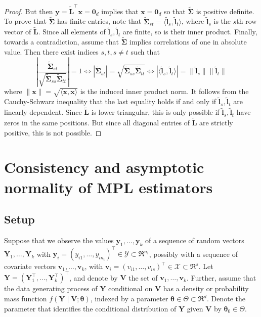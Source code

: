 \documentclass[11pt, a4paper]{article}
\newcommand*{\bb}{\boldsymbol}
\theoremstyle{example} \newtheorem{example}{Example}[section]
\theoremstyle{theorem} \newtheorem{theorem}{Theorem}[section]
\def\btheta{\bb{\theta}}
\def\by{\bb{y}}
\def\bY{\bb{Y}}
\def\bv{\bb{v}}
\def\bV{\bb{V}}
\def\bY{\bb{Y}}
\def\by{\bb{y}}
\def\btnod{\bb{\theta}_0}
\begin{document}
\begin{proof}
	But then $\bb y = \tilde{\bb L}^\top \bb x=\bb 0_d$ implies that $\bb x = \bb 0_d$ so that $\tilde{\bb \Sigma}$ is positive definite. 
	To prove that $\tilde{\bb \Sigma}$ has finite entries, note that $\tilde{\bb \Sigma}_{st} = \langle \tilde{\bb l}_s,\tilde{\bb l}_t \rangle$, where $\tilde{\bb l}_s$ is the $s$th row vector of $\tilde{\bb L}$. Since all elements of $\tilde{\bb l}_s,\tilde{\bb l}_t$ are finite, so is their inner product.  
	Finally, towards a contradiction, assume that $\tilde{\bb \Sigma}$ implies correlations of one in absolute value. Then there exist indices $s,t, s \neq t$ such that 
        \[
          \left|\frac{\tilde{\bb \Sigma}_{st} }{\sqrt{ \tilde{\bb \Sigma}_{ss} \tilde{\bb \Sigma}_{tt}}}\right| =1 	\iff |\tilde{\bb \Sigma}_{st}| = \sqrt{ \tilde{\bb \Sigma}_{ss} \tilde{\bb \Sigma}_{tt}}  
	\iff |\langle \tilde{\bb l}_s,\tilde{\bb l}_t\rangle| = \|\tilde{\bb l}_s\|\|\tilde{\bb l}_t\|
        \]
	where $\|\bb x\|= \sqrt{\langle\bb x ,\bb x\rangle}$ is the induced inner product norm. It follows from the Cauchy-Schwarz inequality that the last equality holds if and only if $\tilde{\bb l}_s,\tilde{\bb l}_t$ are linearly dependent. Since $\tilde{\bb L}$ is lower triangular, this is only possible if $\tilde{\bb l}_s,\tilde{\bb l}_t$ have zeros in the same positions. But since all diagonal entries of $\tilde{\bb L}$ are strictly positive, this is not possible.
\end{proof}

\section{Consistency and asymptotic normality of MPL estimators}
\label{sec:softpen}

\subsection{Setup}

Suppose that we observe the values $\by_1, \ldots, \by_k$ of a
sequence of random vectors $\bY_1, \ldots, \bY_k$ with
$\by_i = (y_{i1}, \ldots, y_{in_i})^\top \in \mathcal{Y} \subset
\Re^{n_i}$, possibly with a sequence of covariate vectors
$\bv_1, \ldots, \bv_k$, with
$\bv_i = (v_{i1}, \ldots, v_{is})^\top \in \mathcal{X} \subset
\Re^{s}$. Let $\bY = (\bY_1^\top, \ldots, \bY_k^\top)^\top$, and
denote by $\bV$ the set of $\bv_1, \ldots, \bv_k$. Further, assume
that the data generating process of $\bY$ conditional on $\bV$ has a
density or probability mass function $f(\bY \mid \bV; \btheta)$,
indexed by a parameter $\btheta \in \Theta \subset \Re^d$. Denote the
parameter that identifies the conditional distribution of $\bY$ given
$\bV$ by $\btnod \in \Theta$.
\end{document}

